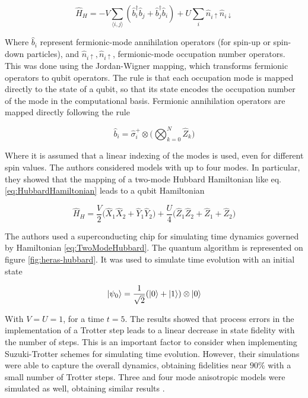   \begin{equation}
    \hat{H}_H = -V \sum_{\langle i,j\rangle} (\hat{b}_i^{\dagger}\hat{b}_j + \hat{b}_j^{\dagger}\hat{b}_i) + U \sum_i \hat{n}_{i\uparrow}\hat{n}_{i\downarrow}
    \label{eq:HubbardHamiltonian}
  \end{equation}

  Where $\hat{b}_i$ represent fermionic-mode annihilation operators (for spin-up or spin-down particles), and $\hat{n}_{i\uparrow},\hat{n}_{i\uparrow}$, fermionic-mode occupation number operators. This was done using the Jordan-Wigner mapping, which transforms fermionic operators to qubit operators. The rule is that each occupation mode is mapped directly to the state of a qubit, so that its state encodes the occupation number of the mode in the computational basis. Fermionic annihilation operators are mapped directly following the rule \cite{Mastersthesis}

  \begin{equation}
    \hat{b}_i = \hat{\sigma}_i^{+} \otimes \Bigg(\bigotimes_{k=0}^{N} \hat{Z}_k \Bigg)
    \label{eq:JWT}
  \end{equation}

  Where it is assumed that a linear indexing of the modes is used, even for different spin values. The authors considered models with up to four modes. In particular, they showed that the mapping of a two-mode Hubbard Hamiltonian like eq. \ref{eq:HubbardHamiltonian} leads to a qubit Hamiltonian

  \begin{equation}
    \hat{H}_H = \frac{V}{2}\big(\hat{X}_1 \hat{X}_2 + \hat{Y}_1 \hat{Y}_2\big) + \frac{U}{4} \big(\hat{Z}_1 \hat{Z}_2 + \hat{Z}_1 + \hat{Z}_2\big)
    \label{eq:TwoModeHubbard}
  \end{equation}

  The authors used a superconducting chip for simulating time dynamics governed by Hamiltonian \ref{eq:TwoModeHubbard}. The quantum algorithm is represented on figure \ref{fig:heras-hubbard}. It was used to simulate time evolution with an initial state
  
  $$
  \ket{\psi_0} = \frac{1}{\sqrt{2}}(\ket{0} + \ket{1}) \otimes \ket{0}
  $$

  With $V=U=1$, for a time $t=5$. The results showed that process errors in the implementation of a Trotter step leads to a linear decrease in state fidelity with the number of steps. This is an important factor to consider when implementing Suzuki-Trotter schemes for simulating time evolution. However, their simulations were able to capture the overall dynamics, obtaining fidelities near $90\%$ with a small number of Trotter steps. Three and four mode anisotropic models were simulated as well, obtaining similar results \cite{HubbardSimulLasHeras}.


